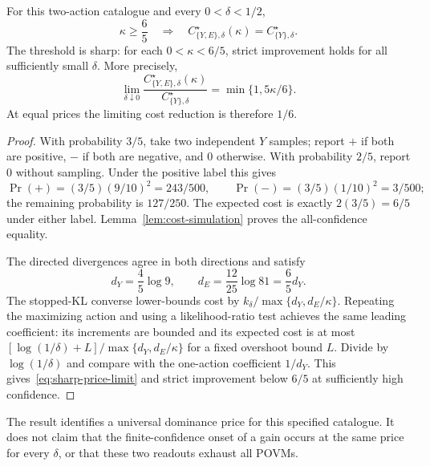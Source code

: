 \begin{theorem}
\label{thm:sharp-price}
For this two-action catalogue and every $0<\delta<1/2$,
\begin{equation}\label{eq:sharp-price-threshold}
 \kappa\geq\frac65\quad\Longrightarrow\quad
 C_{\{Y,E\},\delta}^\star(\kappa)=C_{\{Y\},\delta}^\star.
\end{equation}
The threshold is sharp: for each $0<\kappa<6/5$, strict improvement
holds for all sufficiently small $\delta$. More precisely,
\begin{equation}\label{eq:sharp-price-limit}
 \lim_{\delta\downarrow0}
 \frac{C_{\{Y,E\},\delta}^\star(\kappa)}{C_{\{Y\},\delta}^\star}
 =\min\{1,5\kappa/6\}.
\end{equation}
At equal prices the limiting cost reduction is therefore $1/6$.
\end{theorem}
\begin{proof}
With probability $3/5$, take two independent $Y$ samples; report $+$
if both are positive, $-$ if both are negative, and $0$ otherwise.
With probability $2/5$, report $0$ without sampling. Under the positive
label this gives
\[
 \Pr(+)=(3/5)(9/10)^2=243/500,\qquad
 \Pr(-)=(3/5)(1/10)^2=3/500;
\]
the remaining probability is $127/250$. The expected cost is exactly
$2(3/5)=6/5$ under either label. Lemma~\ref{lem:cost-simulation}
proves the all-confidence equality.

The directed divergences agree in both directions and satisfy
\[
 d_Y=\frac45\log9,\qquad
 d_E=\frac{12}{25}\log81=\frac65d_Y.
\]
The stopped-KL converse lower-bounds cost by
$k_\delta/\max\{d_Y,d_E/\kappa\}$.
Repeating the maximizing action and using a likelihood-ratio test
achieves the same leading coefficient: its increments are bounded and
its expected cost is at most
$[\log(1/\delta)+L]/\max\{d_Y,d_E/\kappa\}$ for a fixed overshoot bound $L$.
Divide by $\log(1/\delta)$ and compare with the one-action coefficient
$1/d_Y$. This gives~\eqref{eq:sharp-price-limit} and strict improvement
below $6/5$ at sufficiently high confidence.
\end{proof}
The result identifies a universal dominance price for this specified
catalogue. It does not claim that the finite-confidence onset of a gain
occurs at the same price for every $\delta$, or that these two readouts
exhaust all POVMs.


